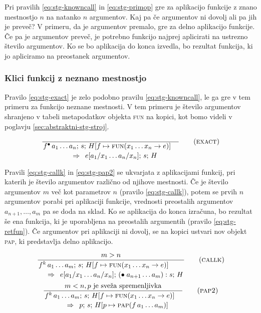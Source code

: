 Pri pravilih \ref{eq:stg-knowncall} in \ref{eq:stg-primop} gre za aplikacijo funkcije z znano mestnostjo $n$ na natanko $n$ argumentov. Kaj pa če argumentov ni dovolj ali pa jih je preveč? V primeru, da je argumentov premalo, gre za delno aplikacijo funkcije. Če pa je argumentov preveč, je potrebno funkcijo najprej aplicirati na ustrezno število argumentov. Ko se bo aplikacija do konca izvedla, bo rezultat funkcija, ki jo apliciramo na preostanek argumentov.

\subsubsection{Klici funkcij z neznano mestnostjo}

Pravilo \ref{eq:stg-exact} je zelo podobno pravilu \ref{eq:stg-knowncall}, le ga gre v tem primeru za funkcijo neznane mestnosti. V tem primeru je število argumentov shranjeno v tabeli metapodatkov objekta \textsc{fun} na kopici, kot bomo videli v poglavju \ref{sec:abstraktni-stg-stroj}.

\begin{equation}
	\linfer[exact]{}{
		f^\bullet \, a_1 \dots a_n ; \, s; \, H[f \mapsto \textsc{fun}(x_1 \dots x_n \to e)]
	}{
		e[a_1 / x_1 \dots a_n / x_n]; \, s; \, H
	}
\label{eq:stg-exact}
\end{equation}

Pravili \ref{eq:stg-callk} in \ref{eq:stg-pap2} se ukvarjata z aplikacijami funkcij, pri katerih je število argumentov različno od njihove mestnosti. Če je število argumentov $m$ več kot parametrov $n$ (pravilo \ref{eq:stg-callk}), potem se prvih $n$ argumentov porabi pri aplikaciji funkcije, vrednosti preostalih argumentov $a_{n + 1}, \dots, a_m$ pa se doda na sklad. Ko se aplikacija do konca izračuna, bo rezultat še ena funkcija, ki je uporabljena na preostalih argumentih (pravilo \ref{eq:stg-retfun}). Če argumentov pri aplikaciji ni dovolj, se na kopici ustvari nov objekt \textsc{pap}, ki predstavlja delno aplikacijo.

\begin{equation}
	\linfer[callk]{
		m > n
	}{
		f^k \, a_1 \dots a_m ; \, s; \, H[f \mapsto \textsc{fun}(x_1 \dots x_n \to e)]
	}{
		e[a_1 / x_1 \dots a_n / x_n]; \, (\bullet \; a_{n + 1} \dots a_m) : s; \, H
	}
\label{eq:stg-callk}
\end{equation}
\vspace{1em}
\begin{equation}
	\linfer[pap2]{
		m < n, \text{$p$ je sveža spremenljivka}
	}{
		f^k \, a_1 \dots a_m ; \, s; \, H[f \mapsto \textsc{fun}(x_1 \dots x_n \to e)]
	}{
		p; \, s; \, H[p \mapsto \textsc{pap}(f \, a_1 \dots a_m)]
	}
\label{eq:stg-pap2}
\end{equation}

